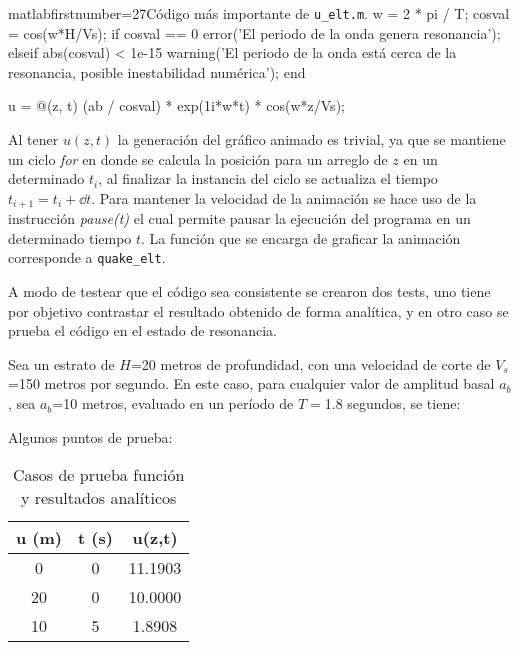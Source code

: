 \begin{sourcecodep}{matlab}{firstnumber=27}{Código más importante de \texttt{u\_elt.m}.}
w = 2 * pi / T;
cosval = cos(w*H/Vs);
if cosval == 0
	error('El periodo de la onda genera resonancia');
elseif abs(cosval) < 1e-15
	warning('El periodo de la onda está cerca de la resonancia, posible inestabilidad numérica');
end

u = @(z, t) (ab / cosval) * exp(1i*w*t) * cos(w*z/Vs);
\end{sourcecodep}

\newp Al tener $u(z,t)$ la generación del gráfico animado es trivial, ya que se mantiene un ciclo \textit{for} en donde se calcula la posición para un arreglo de $z$ en un determinado $t_i$, al finalizar la instancia del ciclo se actualiza el tiempo $t_{i+1} = t_{i} + \dd t$. Para mantener la velocidad de la animación se hace uso de la instrucción \textit{pause(t)} el cual permite pausar la ejecución del programa en un determinado tiempo $t$. La función que se encarga de graficar la animación corresponde a \texttt{quake\_elt}.


A modo de testear que el código sea consistente se crearon dos tests, uno tiene por objetivo contrastar el resultado obtenido de forma analítica, y en otro caso se prueba el código en el estado de resonancia.


Sea un estrato de $H$=20 metros de profundidad, con una velocidad de corte de $V_s$=150 metros por segundo. En este caso, para cualquier valor de amplitud basal $a_b$, sea $a_b$=10 metros, evaluado en un período de $T=$1.8 segundos, se tiene:


Algunos puntos de prueba:

\begin{table}[H]
	\centering
	\caption{Casos de prueba función y resultados analíticos}
	\begin{tabular}{ccc}
		\hline
		u (m) & t (s) & u(z,t) \bigstrut\\
		\hline
		0     & 0     & 11.1903 \bigstrut[t]\\
		20    & 0     & 10.0000 \\
		10    & 5     & 1.8908 \\
	\end{tabular}
\end{table}

